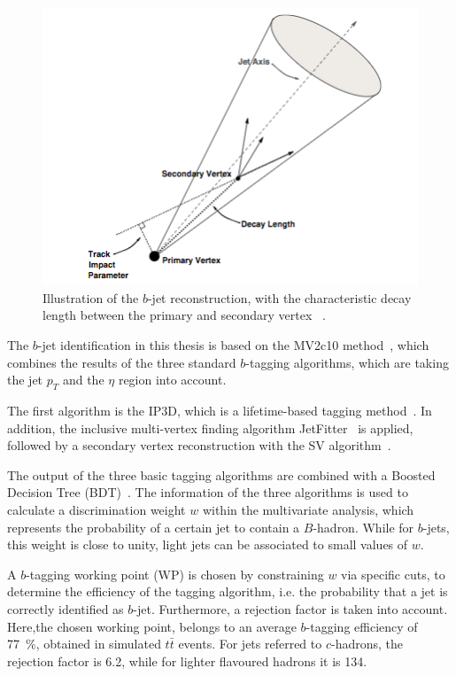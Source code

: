 \begin{figure}[h]
	\centering
	\includegraphics[width=0.5\linewidth]{Pics/btag.png}
	\caption{ Illustration of the $b$-jet reconstruction, with the characteristic decay length between the primary and secondary vertex ~\cite{ATLAS:2010rza}.} 
	\label{fig:42}
\end{figure}

The $b$-jet identification in this thesis is based on the MV2c10 method~\cite{ATL-PHYS-PUB-2016-012}, which combines the results of the three standard  $b$-tagging algorithms, which are taking the jet $p_T$ and the $\eta$ region into account.

 The first algorithm is the IP3D, which is a lifetime-based tagging method~\cite{ATL-PHYS-PUB-2016-012}. In addition, the inclusive multi-vertex finding algorithm JetFitter~\cite{Piacquadio:2008zza} is applied, followed by a secondary vertex reconstruction with the SV algorithm~\cite{ATLAS-CONF-2011-102}.

 The output of the three basic  tagging algorithms are combined with a Boosted Decision Tree (BDT)~\cite{ATL-PHYS-PUB-2016-012}. 
The information of the three algorithms is 
 used to calculate a discrimination weight $w$ within the multivariate analysis, which represents  the probability of a certain jet  to contain a $B$-hadron.  While for $b$-jets, this weight is close to unity, light jets can be associated to small values of $w$.


 
A $b$-tagging working point (WP) is chosen by constraining $w$ via specific cuts, to determine the efficiency of the tagging algorithm, i.e. the probability that a jet is correctly identified as $b$-jet. 
 Furthermore, a rejection factor is taken into account.  Here,the chosen working point, belongs to an average $b$-tagging efficiency of 77~\%, obtained in simulated $t\bar{t}$ events. For jets referred to  $c$-hadrons, the rejection factor is 6.2, while for lighter flavoured  hadrons it is 134. 
 


